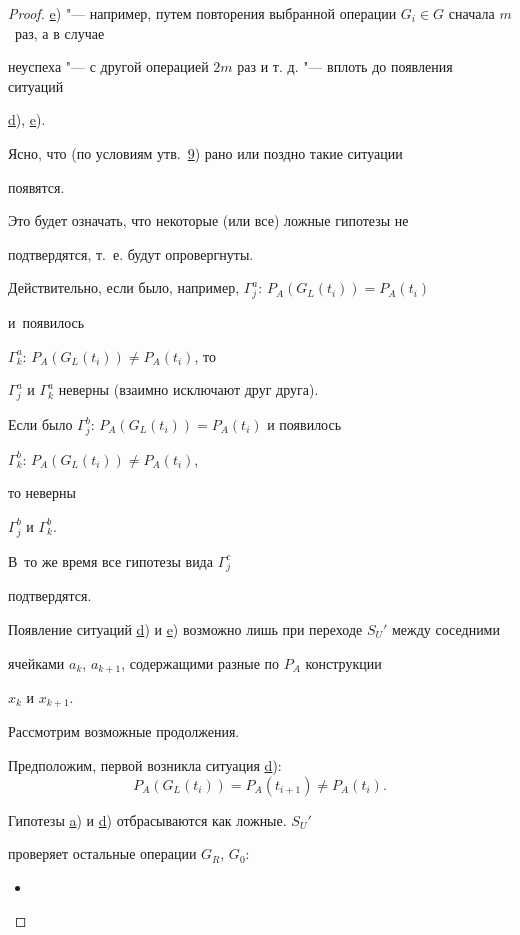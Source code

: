 \begin{proof}
\hyperlink{kr:e1}{e}) "--- например, путем повторения выбранной операции $G_{i}\in G$ сначала $m$~раз, а в случае

неуспеха "--- с другой операцией $2m$ раз и т. д. "--- вплоть до появления ситуаций

\hyperlink{kr:d1}{d}), \hyperlink{kr:e1}{e}). 

Ясно, что (по условиям утв.~\hyperlink{kr:utv9}{9}) рано или поздно такие ситуации

появятся. 

Это будет означать, что некоторые (или все) ложные гипотезы не

подтвердятся, т.~е. будут опровергнуты. 

Действительно, если было, например, $\Gamma^{a}_{j}$: $P_{A}(G_{L}(t_{i}))= P_{A}(t_{i})$ 

и~появилось

$\Gamma^{a}_{k}$: $P_{A}(G_{L}(t_{i})) \ne P_{A}(t_{i})$, то

$\Gamma^{a}_{j}$ и $\Gamma^{a}_{k}$ неверны (взаимно исключают друг друга). 

Если было $\Gamma^{b}_{j}$: $P_{A}(G_{L}(t_{i})) = P_{A}(t_{i})$ и появилось

$\Gamma^{b}_{k}$: $P_{A}(G_{L}(t_{i}))\ne P_{A}(t_{i})$, 

то неверны 

$\Gamma^{b}_{j}$ и $\Gamma^{b}_{k}$. 

В~то же время все гипотезы вида $\Gamma^{c}_{j}$

подтвердятся.



Появление ситуаций \hyperlink{kr:d1}{d}) и \hyperlink{kr:e1}{e}) возможно лишь при переходе $S_{U}'$ между соседними

ячейками $a_{k}$, $a_{k+1}$, содержащими разные по $P_{A}$ конструкции

$x_{k}$ и $x_{k+1}$. 

Рассмотрим возможные продолжения. 

Предположим, первой возникла ситуация \hyperlink{kr:d1}{d}): $$P_{A}(G_{L}(t_{i})) = P_{A}(t_{i+1})\ne P_{A}(t_{i}).$$

Гипотезы \hyperlink{kr:a1}{a}) и \hyperlink{kr:d1}{d}) отбрасываются как ложные. $S_{U}'$

проверяет остальные операции $G_{R}$, $G_{0}$:

\begin{itemize}

\item[\hyperlink{kr:f1}{f})]


\end{itemize}
\end{proof}
